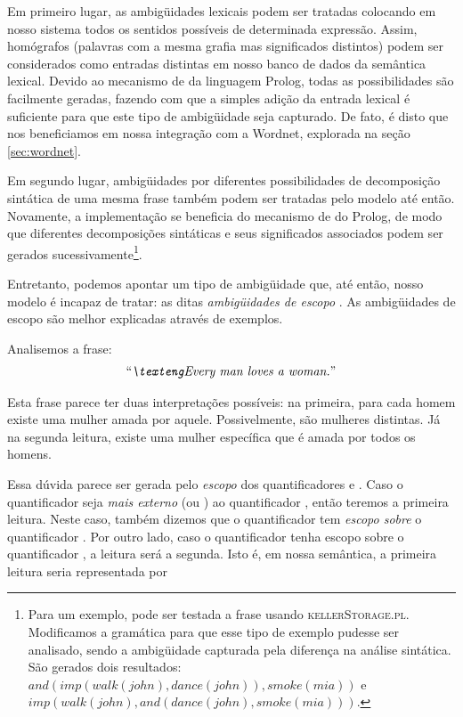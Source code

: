 Em primeiro lugar, as ambigüidades lexicais podem ser tratadas colocando em nosso sistema todos os sentidos possíveis de determinada expressão. Assim, homógrafos (palavras com a mesma grafia mas significados distintos) podem ser considerados como entradas distintas em nosso banco de dados da semântica lexical. Devido ao mecanismo de  da linguagem Prolog, todas as possibilidades são facilmente geradas, fazendo com que a simples adição da entrada lexical é suficiente para que este tipo de ambigüidade seja capturado. De fato, é disto que nos beneficiamos em nossa integração com a Wordnet, explorada na seção \ref{sec:wordnet}.

Em segundo lugar, ambigüidades por diferentes possibilidades de decomposição sintática de uma mesma frase também podem ser tratadas pelo modelo até então. Novamente, a implementação se beneficia do mecanismo de  do Prolog, de modo que diferentes decomposições sintáticas e seus significados associados podem ser gerados sucessivamente\footnote{Para um exemplo, pode ser testada a frase  usando \textsc{kellerStorage.pl}. Modificamos a gramática para que esse tipo de exemplo pudesse ser analisado, sendo a ambigüidade capturada pela diferença na análise sintática. São gerados dois resultados: $and(imp(walk(john),dance(john)),smoke(mia))$ e $imp(walk(john),and(dance(john),smoke(mia)))$.}.

Entretanto, podemos apontar um tipo de ambigüidade que, até então, nosso modelo é incapaz de tratar: as ditas \textit{ambigüidades de escopo} \citep[p.~105-109]{BlackburnBos:2005}. As ambigüidades de escopo são melhor explicadas através de exemplos.

Analisemos a frase: 
\begin{align*}
\text{\expreng{Every man loves a woman.}}
\end{align*}%

Esta frase parece ter duas interpretações possíveis: na primeira, para cada homem existe uma mulher amada por aquele. Possivelmente, são mulheres distintas. Já na segunda leitura, existe uma mulher específica que é amada por todos os homens.

Essa dúvida parece ser gerada pelo \textit{escopo} dos quantificadores  e . Caso o quantificador  seja \textit{mais externo} (ou \textit{}) ao quantificador , então teremos a primeira leitura. Neste caso, também dizemos que o quantificador  tem \textit{escopo sobre} o quantificador . Por outro lado, caso o quantificador  tenha escopo sobre o quantificador , a leitura será a segunda. Isto é, em nossa semântica, a primeira leitura seria representada por


